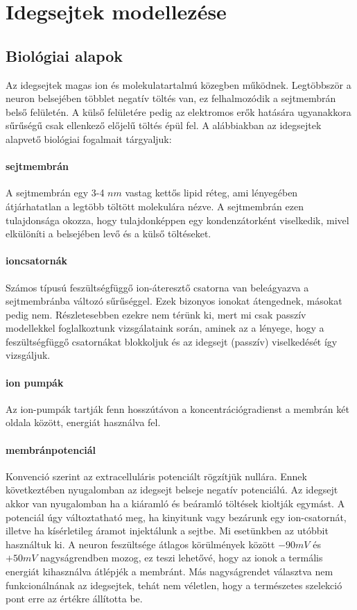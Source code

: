 \section{Idegsejtek modellezése}



\subsection{Biológiai alapok}
Az idegsejtek magas ion és molekulatartalmú közegben működnek. Legtöbbször a neuron belsejében többlet negatív töltés van, ez felhalmozódik a sejtmembrán belső felületén. A külső felületére pedig az elektromos erők hatására ugyanakkora sűrűségű csak ellenkező előjelű töltés épül fel. A alábbiakban az idegsejtek alapvető biológiai fogalmait tárgyaljuk:

\paragraph{sejtmembrán}
A sejtmembrán egy 3-4 $nm$ vastag kettős lipid réteg, ami lényegében átjárhatatlan a legtöbb töltött molekulára nézve. A sejtmembrán ezen tulajdonsága okozza, hogy tulajdonképpen egy kondenzátorként viselkedik, mivel elkülöníti a belsejében levő és a külső töltéseket.

\paragraph{ioncsatornák}
Számos típusú feszültségfüggő ion-áteresztő csatorna van beleágyazva a sejtmembránba változó sűrűséggel. Ezek bizonyos ionokat átengednek, másokat pedig nem. Részletesebben ezekre nem térünk ki, mert mi csak passzív modellekkel foglalkoztunk vizsgálataink során, aminek az a lényege, hogy a feszültségfüggő csatornákat blokkoljuk és az idegsejt (passzív) viselkedését így vizsgáljuk.

\paragraph{ion pumpák}
Az ion-pumpák tartják fenn hosszútávon a koncentrációgradienst a membrán két oldala között, energiát használva fel.

\paragraph{membránpotenciál}
Konvenció szerint az extracelluláris potenciált rögzítjük nullára. Ennek következtében nyugalomban az idegsejt belseje negatív potenciálú. Az idegsejt akkor van nyugalomban ha a kiáramló és beáramló töltések kioltják egymást. A potenciál úgy változtatható meg, ha kinyitunk vagy bezárunk egy ion-csatornát, illetve ha kísérletileg áramot injektálunk a sejtbe. Mi esetünkben az utóbbit használtuk ki.
A neuron feszültsége átlagos körülmények között $-90 mV$ és $+50 mV$ nagyságrendben mozog, ez teszi lehetővé, hogy az ionok a termális energiát kihasználva átlépjék a membránt. Más nagyságrendet választva nem funkcionálnának az idegsejtek, tehát nem véletlen, hogy a természetes szelekció pont erre az értékre állította be.

